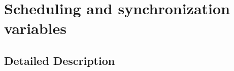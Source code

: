 \hypertarget{group__chaos-test-variables-sched-sync}{\section{Scheduling and synchronization variables}
\label{group__chaos-test-variables-sched-sync}
}


\subsection{Detailed Description}
